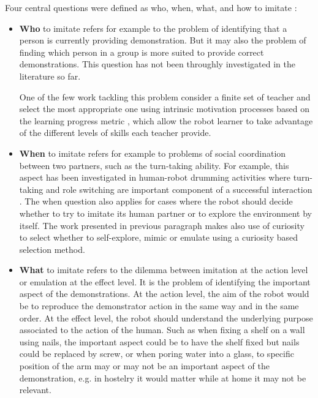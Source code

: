 Four central questions were defined as who, when, what, and how to imitate \cite{nehaniv2000hummingbirds}:
\begin{itemize}

\item \textbf{Who} to imitate refers for example to the problem of identifying that a person is currently providing demonstration. But it may also the problem of finding which person in a group is more suited to provide correct demonstrations. This question has not been throughly investigated in the literature so far.

One of the few work tackling this problem consider a finite set of teacher and select the most appropriate one using intrinsic motivation processes based on the learning progress metric \cite{Nguyen2012PJBR}, which allow the robot learner to take advantage of the different levels of skills each teacher provide.

\item \textbf{When} to imitate refers for example to problems of social coordination between two partners, such as the turn-taking ability. For example, this aspect has been investigated in human-robot drumming activities where turn-taking and role switching are important component of a successful interaction \cite{weinberg2006robot,kose2008emergent}. The when question also applies for cases where the robot should decide whether to try to imitate its human partner or to explore the environment by itself. The work presented in previous paragraph \cite{Nguyen2012PJBR} makes also use of curiosity to select whether to self-explore, mimic or emulate using a curiosity based selection method.

\item \textbf{What} to imitate refers to the dilemma between imitation at the action level or emulation at the effect level. It is the problem of identifying the important aspect of the demonstrations. At the action level, the aim of the robot would be to reproduce the demonstrator action in the same way and in the same order. At the effect level, the robot should understand the underlying purpose associated to the action of the human. Such as when fixing a shelf on a wall using nails, the important aspect could be to have the shelf fixed but nails could be replaced by screw, or when poring water into a glass, to specific position of the arm may or may not be an important aspect of the demonstration, e.g. in hostelry it would matter while at home it may not be relevant. 


\end{itemize}
